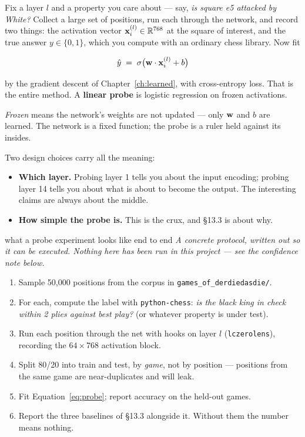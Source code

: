 Fix a layer $l$ and a property you care about --- say, \emph{is square e5 attacked by White?}
Collect a large set of positions, run each through the network, and record two things: the
activation vector $\mathbf{x}^{(l)}_i \in \mathbb{R}^{768}$ at the square of interest, and the true
answer $y \in \{0,1\}$, which you compute with an ordinary chess library. Now fit

\begin{equation}
  \label{eq:probe}
  \hat{y} \;=\; \sigma\bigl(\mathbf{w}\cdot\mathbf{x}^{(l)}_i + b\bigr)
\end{equation}

by the gradient descent of Chapter~\ref{ch:learned}, with cross-entropy loss. That is the
entire method. A \textbf{linear probe} is logistic regression on frozen activations.

\begin{notationbox}
\emph{Frozen} means the network's weights are not updated --- only $\mathbf{w}$ and $b$ are
learned. The network is a fixed function; the probe is a ruler held against its insides.
\end{notationbox}

Two design choices carry all the meaning:

\begin{itemize}
\item \textbf{Which layer.} Probing layer 1 tells you about the input encoding; probing layer
  14 tells you about what is about to become the output. The interesting claims are always
  about the middle.
\item \textbf{How simple the probe is.} This is the crux, and §13.3 is about why.
\end{itemize}

\begin{worked}{what a probe experiment looks like end to end}
\emph{A concrete protocol, written out so it can be executed. Nothing here has been run in
this project --- see the confidence note below.}
\begin{enumerate}
\item Sample 50{,}000 positions from the corpus in \texttt{games\_of\_derdiedasdie/}.
\item For each, compute the label with \texttt{python-chess}: \emph{is the black king in
  check within 2 plies against best play?} (or whatever property is under test).
\item Run each position through the net with hooks on layer $l$ (\texttt{lczerolens}),
  recording the $64\times768$ activation block.
\item Split 80/20 into train and test, by \emph{game}, not by position --- positions from the
  same game are near-duplicates and will leak.
\item Fit Equation~\eqref{eq:probe}; report accuracy on the held-out games.
\item Report the three baselines of §13.3 alongside it. Without them the number means nothing.
\end{enumerate}
\end{worked}

